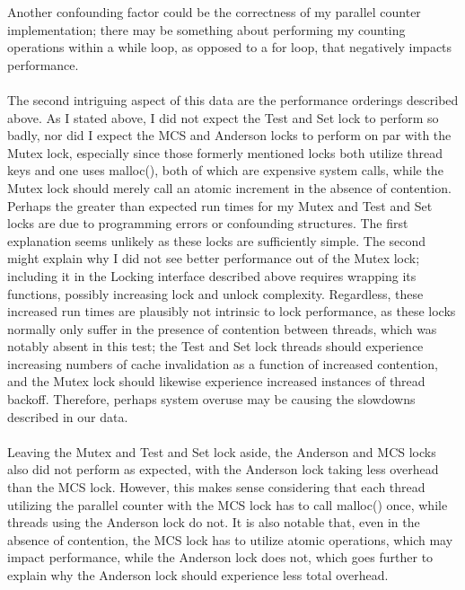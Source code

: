 \documentclass[]{article}
\begin{document}
Another confounding factor could be the correctness of my parallel counter implementation; there may be something about performing my counting operations within a while loop, as opposed to a for loop, that negatively impacts performance.
\\\\
The second intriguing aspect of this data are the performance orderings described above. As I stated above, I did not expect the Test and Set lock to perform so badly, nor did I expect the MCS and Anderson locks to perform on par with the Mutex lock, especially since those formerly mentioned locks both utilize thread keys and one uses malloc(), both of which are expensive system calls, while the Mutex lock should merely call an atomic increment in the absence of contention.
\\
Perhaps the greater than expected run times for my Mutex and Test and Set locks are due to programming errors or confounding structures. The first explanation seems unlikely as these locks are sufficiently simple. The second might explain why I did not see better performance out of the Mutex lock; including it in the Locking interface described above requires wrapping its functions, possibly increasing lock and unlock complexity. Regardless, these increased run times are plausibly not intrinsic to lock performance, as these locks normally only suffer in the presence of contention between threads, which was notably absent in this test; the Test and Set lock threads should experience increasing numbers of cache invalidation as a function of increased contention, and the Mutex lock should likewise experience increased instances of thread backoff. Therefore, perhaps system overuse may be causing the slowdowns described in our data.
\\\\
Leaving the Mutex and Test and Set lock aside, the Anderson and MCS locks also did not perform as expected, with the Anderson lock taking less overhead than the MCS lock. However, this makes sense considering that each thread utilizing the parallel counter with the MCS lock has to call malloc() once, while threads using the Anderson lock do not. It is also notable that, even in the absence of contention, the MCS lock has to utilize atomic operations, which may impact performance, while the Anderson lock does not, which goes further to explain why the Anderson lock should experience less total overhead.
\end{document}
